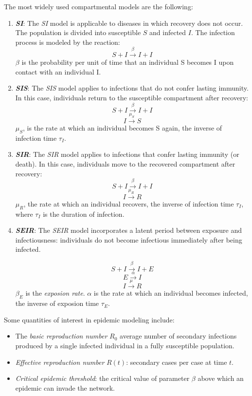The most widely used compartmental models are the following:
\begin{enumerate}
    \item \textbf{\textit{SI}}:
        The \textit{SI} model is applicable to diseases in which recovery does not occur. The population is divided into susceptible $S$ and infected $I$. The infection process is modeled by the reaction: $$S+I\xrightarrow{\beta}I+I$$ $\beta$  is the probability per unit of time that an individual S becomes I upon contact with an individual I. 
    \item \textbf{\textit{SIS}}:
        The \textit{SIS} model applies to infections that do not confer lasting immunity. In this case, individuals return to the susceptible compartment after recovery: $$S+I\xrightarrow{\beta}I+I$$ $$I\xrightarrow{\mu_S}S$$
        $\mu_S$, is the rate at which an individual becomes S again, the inverse of infection time $\tau_I$.
    \item \textbf{\textit{SIR}}:
        The \textit{SIR} model applies to infections that confer lasting immunity (or death). In this case, individuals move to the recovered compartment after recovery: $$S+I\xrightarrow{\beta}I+I$$ $$I\xrightarrow{\mu_R}R$$
        $\mu_R$, the rate at which an individual recovers, the inverse of infection time $\tau_I$, where $\tau_I$ is the duration of infection.  
    \item \textbf{\textit{SEIR}}:
        The \textit{SEIR} model incorporates a latent period between exposure and infectiousness: individuals do not become infectious immediately after being infected.

        $$S+I\xrightarrow{\beta}I+E$$
        $$E\xrightarrow{\alpha}I$$
        $$I\xrightarrow{\mu}R$$
        $\beta_E$ is the \textit{exposion rate}. $\alpha$ is the rate at which an individual becomes infected, the inverse of exposion time $\tau_E$. 
\end{enumerate}

Some quantities of interest in epidemic modeling include:
\begin{itemize}
\item The \textit{basic reproduction number} $R_0$ average number of secondary infections produced by a single infected individual in a fully susceptible population.
\item \textit{Effective reproduction number} $R(t)$: secondary cases per case at time $t$.
\item \textit{Critical epidemic threshold}: the critical value of parameter $\beta$ above which an epidemic can invade the network.
\end{itemize}

